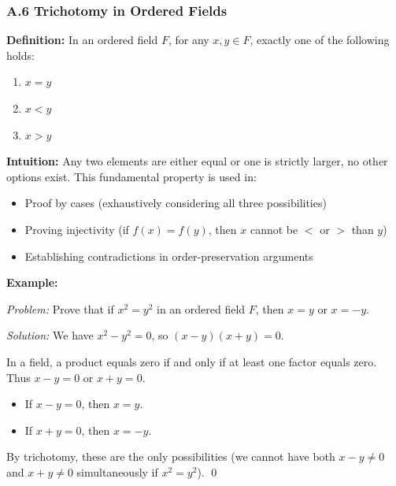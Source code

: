 \subsubsection*{A.6 Trichotomy in Ordered Fields}

\textbf{Definition:}
In an ordered field $F$, for any $x, y \in F$, exactly one of the following holds:
\begin{enumerate}
    \item $x = y$
    \item $x < y$  
    \item $x > y$
\end{enumerate}

\textbf{Intuition:}
Any two elements are either equal or one is strictly larger, no other options exist. This fundamental property is used in:
\begin{itemize}
    \item Proof by cases (exhaustively considering all three possibilities)
    \item Proving injectivity (if $f(x) = f(y)$, then $x$ cannot be $<$ or $>$ than $y$)
    \item Establishing contradictions in order-preservation arguments
\end{itemize}

\textbf{Example:}

\textit{Problem:} Prove that if $x^2 = y^2$ in an ordered field $F$, then $x = y$ or $x = -y$.

\textit{Solution:} We have $x^2 - y^2 = 0$, so $(x-y)(x+y) = 0$. 

In a field, a product equals zero if and only if at least one factor equals zero. Thus $x - y = 0$ or $x + y = 0$.

\begin{itemize}
    \item If $x - y = 0$, then $x = y$.
    \item If $x + y = 0$, then $x = -y$.
\end{itemize}

By trichotomy, these are the only possibilities (we cannot have both $x - y \neq 0$ and $x + y \neq 0$ simultaneously if $x^2 = y^2$). \qed

\vspace{1em}
